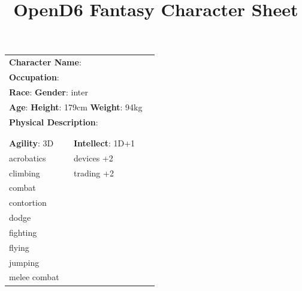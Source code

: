 \documentclass[10pt]{article}
\title{OpenD6 Fantasy Character Sheet}
\begin{document}
\pagestyle{fancy}
\fancyhf{}
\fancyfoot[R]{\thepage}
\renewcommand{\headrulewidth}{0pt}


\cleardoublepage
\begin{table}
\begin{tabular}{m{156pt} m{156pt} m{156pt}}
    \multicolumn{2}{l}{\textbf{Character Name}:  \hrulefill} \\
    \multicolumn{2}{l}{\textbf{Occupation}:  \hrulefill} \\
    \multicolumn{2}{l}{\textbf{Race}:  \hrulefill \hspace{1em} \textbf{Gender}: inter \hrulefill} \\
    \multicolumn{2}{l}{\textbf{Age}:  \hrulefill \hspace{1em} \textbf{Height}: 179cm \hrulefill \hspace{1em}  \textbf{Weight}: 94kg \hrulefill } \\
    \multicolumn{2}{l}{\textbf{Physical Description}:  \hrulefill } \\
    \multicolumn{2}{l}{ \hrulefill } \\
 & & \\
\textbf{Agility}: 3D \hrulefill      & \textbf{Intellect}: 1D+1 \hrulefill  &                             \\

acrobatics           \hrulefill & devices           +2 \hrulefill & \\

climbing             \hrulefill & trading           +2 \hrulefill & \\

combat               \hrulefill &  \hrulefill & \\

contortion           \hrulefill &  \hrulefill & \\

dodge                \hrulefill &  \hrulefill & \\

fighting             \hrulefill &  \hrulefill & \\

flying               \hrulefill &  \hrulefill & \\

jumping              \hrulefill &  \hrulefill & \\

melee combat         \hrulefill &  \hrulefill & \\


\end{tabular}
\end{table}
\end{document}
